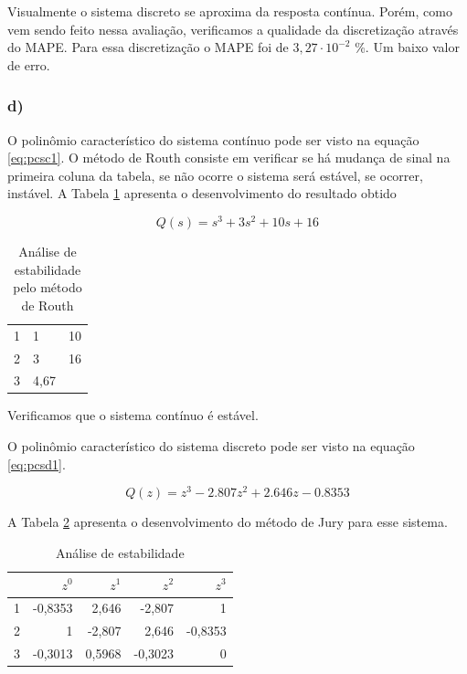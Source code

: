     Visualmente o sistema discreto se aproxima da resposta contínua. Porém, como vem sendo feito nessa 
    avaliação, verificamos a qualidade da discretização através do MAPE. Para essa discretização o 
    MAPE foi de $3,27 \cdot 10^{-2}$ \%. Um baixo valor de erro.

\subsubsection*{d)}

O polinômio característico do sistema contínuo pode ser visto na equação \ref{eq:pcsc1}. O método
de Routh consiste em verificar se há mudança de sinal na primeira coluna da tabela, se não ocorre
o sistema será estável, se ocorrer, instável. A Tabela \ref{tab:RE1} apresenta o desenvolvimento do
resultado obtido 

\begin{equation}
    Q(s) = s^3+3s^2+10s+16
    \label{eq:pcsc1}
\end{equation}

\begin{table}[!ht]
    \centering
    \vspace{0.5cm}
    \caption{Análise de estabilidade pelo método de Routh} 
    \begin{tabular}{r|lr}
        
        1 & 1 & 10 \\
        2 & 3 & 16 \\
        3 & 4{,}67\\
    \end{tabular}                
    \label{tab:RE1}
\end{table}

Verificamos que o sistema contínuo é estável.

O polinômio característico do sistema discreto pode ser visto na equação \ref{eq:pcsd1}.

\begin{equation}
    Q(z) = z^3 - 2.807 z^2 + 2.646 z - 0.8353
    \label{eq:pcsd1}
\end{equation}

A Tabela \ref{tab:JE1} apresenta o desenvolvimento do método de Jury para esse sistema.

\begin{table}[!ht]
    \centering
    \caption{Análise de estabilidade} 
    \begin{tabular}{l| r r r r}
         & $z^0$ & $z^1$ & $z^2$ & $z^3$\\
        \hline
        1 & -0{,}8353 & 2{,}646 & -2{,}807 & 1\\
        2 & 1 & -2{,}807 & 2{,}646 & -0{,}8353\\
        3 & -0{,}3013 & 0{,}5968 & -0{,}3023 & 0\\
    \end{tabular}                
    \label{tab:JE1}
\end{table}

